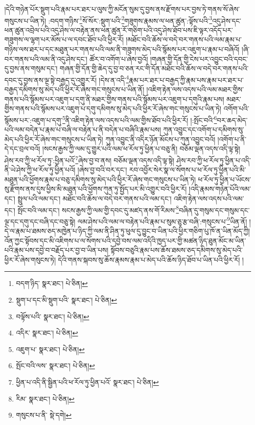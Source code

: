 །དེའི་གཉེན་པོར་སྡུག་པའི་རྣམ་པར་ཐར་པ་ལུས་ཀྱི་མངོན་སུམ་དུ་བྱས་ནས་རྫོགས་པར་བྱས་ཏེ་གནས་སོ་ཞེས་གསུངས་པ་ཡིན་ཏེ། :བདག་གཉིས་\footnote{བདག་ཉིད་  སྣར་ཐང་།  པེ་ཅིན། }སོ་སོར་:སྡུག་པའི་\footnote{སྡུག་པ་དང་མི་སྡུག་པའི་  སྣར་ཐང་།  པེ་ཅིན། }གཟུགས་རྣམས་ལ་ཕན་ཚུན་:ལྟོས་པའི་\footnote{བལྟོས་པའི་  སྣར་ཐང་།  པེ་ཅིན། }འདུ་ཤེས་དང་ཕན་ཚུན་འབྲེལ་པའི་འདུ་ཤེས་ལ་བརྟེན་ནས་ཕན་ཚུན་རོ་གཅིག་པའི་འདུ་ཤེས་ཐོབ་པས་ཇི་ལྟར་འདོད་པར་གཟུགས་ལ་ལྷག་པར་མོས་པ་ལ་དབང་ཐོབ་པའི་ཕྱིར་རོ། །མཐོང་བའི་ཆོས་ལ་བདེ་བར་གནས་པའི་ལམ་རྣམ་པ་གཉིས་ལས་ཐར་པ་དང་མཐུན་པར་གནས་པའི་ལམ་ནི་གཟུགས་མེད་པའི་སྙོམས་པར་འཇུག་པ་རྣམ་པ་བཞིའོ། །ཞི་བར་གནས་པའི་ལམ་ནི་འདུ་ཤེས་དང་། ཚོར་བ་འགོག་པ་ཞེས་བྱའོ། །གཞན་གྱི་དོན་གྱི་ངེས་པར་འབྱུང་བའི་དབང་དུ་བྱས་ནས་གསུམ་དང་། གཞན་གྱི་དོན་གྱི་ཆེད་དུ་བྱ་བ་ཅན་རང་གི་དོན་མཐོང་བའི་ཆོས་ལ་བདེ་བར་གནས་པའི་དབང་དུ་བྱས་ནས་ལྔ་སྟེ་བརྒྱད་དུ་འགྱུར་རོ། །དེས་ན་འདི་\footnote{འདིར་  སྣར་ཐང་།  པེ་ཅིན། }རྣམ་པར་ཐར་པ་བརྒྱད་ཀྱི་རྣམ་པས་རྣམ་པར་ཐར་པ་བརྒྱད་དམིགས་སུ་མེད་པའི་ཕྱིར་རོ་ཞེས་གང་གསུངས་པ་ཡིན་ནོ། །འཇིག་རྟེན་ལས་འདས་པའི་ལམ་མཐར་གྱིས་གནས་པའི་སྙོམས་པར་འཇུག་པ་དགུ་ནི་མཐར་གྱིས་གནས་པའི་སྙོམས་པར་འཇུག་པ་དགུའི་རྣམ་པས། མཐར་གྱིས་གནས་པའི་སྙོམས་པར་འཇུག་པ་དགུ་དམིགས་སུ་མེད་པའི་ཕྱིར་རོ་ཞེས་གང་གསུངས་པ་ཡིན་ཏེ། འགོག་པའི་སྙོམས་པར་:འཇུག་པ་དགུ་\footnote{འཇུག་པ་  སྣར་ཐང་།  པེ་ཅིན། }ནི་འཇིག་རྟེན་ལས་འདས་པའི་ལམ་གྱིས་ཐོབ་པའི་ཕྱིར་རོ། །:སྤོང་བའི་\footnote{སྤོང་བའི་ལས་  སྣར་ཐང་།  པེ་ཅིན། }བར་ཆད་མེད་པའི་ལམ་བདེན་པ་རྣམ་པ་བཞི་ལ་བརྟེན་པ་ནི་བདེན་པ་བཞིའི་རྣམ་པས། ཀུན་འབྱུང་དང་འགོག་པ་དམིགས་སུ་མེད་པའི་ཕྱིར་རོ་ཞེས་གང་གསུངས་པ་ཡིན་ཏེ། ཀུན་འབྱུང་ནི་འདིར་ཉོན་མོངས་པ་ཀུན་འབྱུང་བའོ། །འགོག་པ་ནི་དེ་དང་བྲལ་བའོ། །སངས་རྒྱས་ཀྱི་ལམ་དུ་གྱུར་པའི་ལམ་ཕ་རོལ་ཏུ་ཕྱིན་པ་བཅུ་ནི། བཅོམ་ལྡན་འདས་འདི་ལྟ་སྟེ། ཤེས་རབ་ཀྱི་ཕ་རོལ་ཏུ་:ཕྱིན་པའོ་\footnote{ཕྱིན་པ་འདི་ནི་སྦྱིན་པའི་ཕ་རོལ་ཏུ་ཕྱིན་པའོ་  སྣར་ཐང་།  པེ་ཅིན། }ཞེས་བྱ་བ་ནས། བཅོམ་ལྡན་འདས་འདི་ལྟ་སྟེ། ཤེས་རབ་ཀྱི་ཕ་རོལ་ཏུ་ཕྱིན་པ་འདི་ནི་ཡེ་ཤེས་ཀྱི་ཕ་རོལ་ཏུ་ཕྱིན་པའོ། །ཞེས་བྱ་བའི་བར་དང་། རབ་འབྱོར་སེར་སྣ་ལ་སོགས་པ་ཕ་རོལ་ཏུ་ཕྱིན་པའི་མི་མཐུན་པའི་ཕྱོགས་རྣམ་པ་བཅུ་དམིགས་སུ་མེད་པའི་ཕྱིར་རོ་ཞེས་གང་གསུངས་པ་ཡིན་ཏེ། ཕ་རོལ་ཏུ་ཕྱིན་པ་ཡོངས་སུ་རྫོགས་ནས་དུས་ཕྱིས་མི་མཐུན་པའི་ཕྱོགས་ཀུན་ཏུ་སྤྱོད་པར་མི་འགྱུར་བའི་ཕྱིར་རོ། །འདི་རྣམས་གཉེན་པོའི་ལམ་དང་། སྤྲུལ་པའི་ལམ་དང་། མཐོང་བའི་ཆོས་ལ་བདེ་བར་གནས་པའི་ལམ་དང་། འཇིག་རྟེན་ལས་འདས་པའི་ལམ་དང་། སྤོང་བའི་ལམ་དང་། སངས་རྒྱས་ཀྱི་ལམ་གྱི་དབང་དུ་མཛད་ནས་གོ་རིམས་\footnote{རིམ་  སྣར་ཐང་།  པེ་ཅིན། }བཞིན་དུ་གསུམ་དང་གསུམ་དང་ལྔ་དང་དགུ་དང་བཞི་དང་བཅུ་སྟེ། ལམ་ཤེས་པའི་ལམ་ལ་བརྟེན་པའི་རྣམ་པ་སུམ་ཅུ་རྩ་བཞི་:གསུངས་པ་\footnote{གསུངས་པ་ནི་  སྡེ་དགེ། }ཡིན་ནོ། །དེ་ལ་རྣམ་པ་ཐམས་ཅད་མཁྱེན་པ་ཉིད་ཀྱི་ལམ་ནི་ཤིན་ཏུ་ཕུལ་དུ་བྱུང་བ་ཡིན་པའི་ཕྱིར་གཅིག་པུ་ཁོ་ན་ཡིན་མོད་ཀྱི། འོན་ཀྱང་སྟོབས་དང་མི་འཇིགས་པ་ལ་སོགས་པའི་དབྱེ་བས་ལམ་འདིའི་ཁྱད་པར་གྱི་མཚན་ཉིད་ཐུན་མོང་མ་ཡིན་པའི་རྣམ་པས་དབྱེ་བ་བརྗོད་པར་བྱ་བ་ཡིན་པས། སྟོབས་བཅུའི་རྣམ་པས་ཆོས་ཐམས་ཅད་དམིགས་སུ་མེད་པའི་ཕྱིར་རོ་ཞེས་གསུངས་ཏེ། དེའི་གནས་སྐབས་སུ་ཆོས་རྣམས་རྣམ་པ་མེད་པའི་ཆོས་ཉིད་ཐོབ་པ་ཡིན་པའི་ཕྱིར་རོ། །
